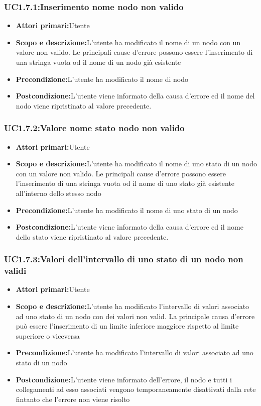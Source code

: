 \subsubsection{UC1.7.1:Inserimento nome nodo non valido}
\begin{itemize}
	\item{\textbf{Attori primari:}Utente}
	\item{\textbf{Scopo e descrizione:}L'utente ha modificato il nome di un nodo con un valore non valido. Le principali cause d'errore possono essere l'inserimento di una stringa vuota od il nome di un nodo già esistente}
	\item{\textbf{Precondizione:}L'utente ha modificato il nome di nodo}
	\item{\textbf{Postcondizione:}L'utente viene informato della causa d'errore ed il nome del nodo viene ripristinato al valore precedente.}
\end{itemize}
\subsubsection{UC1.7.2:Valore nome stato nodo non valido}
\begin{itemize}
	\item{\textbf{Attori primari:}Utente}
	\item{\textbf{Scopo e descrizione:}L'utente ha modificato il nome di uno stato di un nodo con un valore non valido. Le principali cause d'errore possono essere l'inserimento di una stringa vuota od il nome di uno stato già esistente all'interno dello stesso nodo}
	\item{\textbf{Precondizione:}L'utente ha modificato il nome di uno stato di un nodo}
	\item{\textbf{Postcondizione:}L'utente viene informato della causa d'errore ed il nome dello stato viene ripristinato al valore precedente.}
\end{itemize}
\subsubsection{UC1.7.3:Valori dell'intervallo di uno stato di un nodo non validi}
\begin{itemize}
	\item{\textbf{Attori primari:}Utente}
	\item{\textbf{Scopo e descrizione:}L'utente ha modificato l'intervallo di valori associato ad uno stato di un nodo con dei valori non valid. La principale causa d'errore può essere l'inserimento di un limite inferiore maggiore rispetto al limite superiore o viceversa }
	\item{\textbf{Precondizione:}L'utente ha modificato l'intervallo di valori associato ad uno stato di un nodo}
	\item{\textbf{Postcondizione:}L'utente viene informato dell'errore, il nodo e tutti i collegamenti ad esso associati vengono temporaneamente disattivati dalla rete fintanto che l'errore non viene risolto}
\end{itemize}
